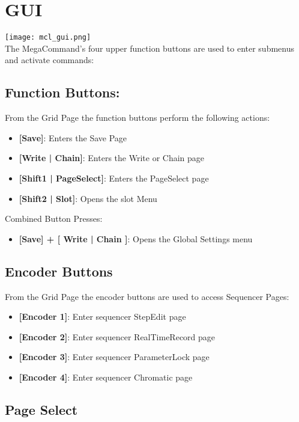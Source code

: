 \chapter{GUI}

\texttt{[image: mcl\_gui.png]}\\
The MegaCommand's four upper function buttons are used to enter submenus and activate commands:
\section{Function Buttons:}
From the Grid Page the function buttons perform the following actions:
\begin{itemize}
\item{\textbf{[Save]}: Enters the Save Page}
\item{\textbf{[Write | Chain]}: Enters the Write or Chain page}
\item{\textbf{[Shift1 | PageSelect]}: Enters the PageSelect page}
\item{\textbf{[Shift2 | Slot]}: Opens the slot Menu }
\end{itemize}
Combined Button Presses:
\begin{itemize}
\item{\textbf{[Save] + [ Write | Chain ]}: Opens the Global Settings menu }
\end{itemize}

\section{Encoder Buttons}
From the Grid Page the encoder buttons are used to access Sequencer Pages:
\begin{itemize}
\item{\textbf{[Encoder 1]}: Enter sequencer StepEdit page}
\item{\textbf{[Encoder 2]}: Enter sequencer RealTimeRecord page}
\item{\textbf{[Encoder 3]}: Enter sequencer ParameterLock page}
\item{\textbf{[Encoder 4]}: Enter sequencer Chromatic page}

\end{itemize}

\section{Page Select}

